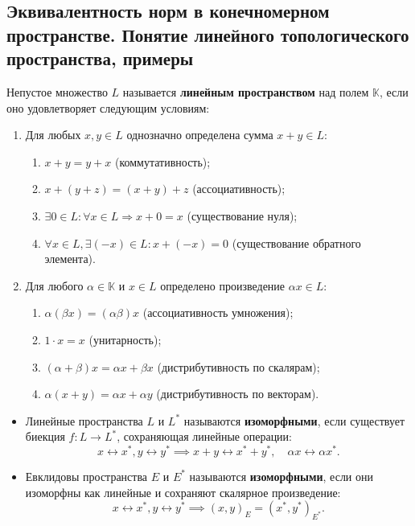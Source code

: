 \subsection{Эквивалентность норм в конечномерном пространстве. Понятие линейного топологического пространства, примеры}
\begin{definition}
	Непустое множество $L$ называется \textbf{линейным пространством} над полем $\mathbb{K}$, если оно удовлетворяет следующим условиям:
	\begin{enumerate}
		\item Для любых $x, y \in L$ однозначно определена сумма $x + y \in L$:
		\begin{enumerate}
			\item $x + y = y + x$ (коммутативность);
			\item $x + (y + z) = (x + y) + z$ (ассоциативность);
			\item $\exists 0 \in L : \forall x \in L \Rightarrow x + 0 = x$ (существование нуля);
			\item $\forall x \in L, \exists (-x) \in L : x + (-x) = 0$ (существование обратного элемента).
		\end{enumerate}
		\item Для любого $\alpha \in \mathbb{K}$ и $x \in L$ определено произведение $\alpha x \in L$:
		\begin{enumerate}
			\item $\alpha (\beta x) = (\alpha \beta) x$ (ассоциативность умножения);
			\item $1 \cdot x = x$ (унитарность);
			\item $(\alpha + \beta) x = \alpha x + \beta x$ (дистрибутивность по скалярам);
			\item $\alpha (x + y) = \alpha x + \alpha y$ (дистрибутивность по векторам).
		\end{enumerate}
	\end{enumerate}
\end{definition}

\begin{definition}[Изоморфизмы]
	\begin{itemize}
		\item Линейные пространства $L$ и $L^*$ называются \textbf{изоморфными}, если существует биекция $f: L \to L^*$, сохраняющая линейные операции:
		\[ x \leftrightarrow x^*, y \leftrightarrow y^* \implies x+y \leftrightarrow x^*+y^*, \quad \alpha x \leftrightarrow \alpha x^*. \]
		\item Евклидовы пространства $E$ и $E^*$ называются \textbf{изоморфными}, если они изоморфны как линейные и сохраняют скалярное произведение:
		\[ x \leftrightarrow x^*, y \leftrightarrow y^* \implies (x, y)_E = (x^*, y^*)_{E^*}. \]
	\end{itemize}
\end{definition}

